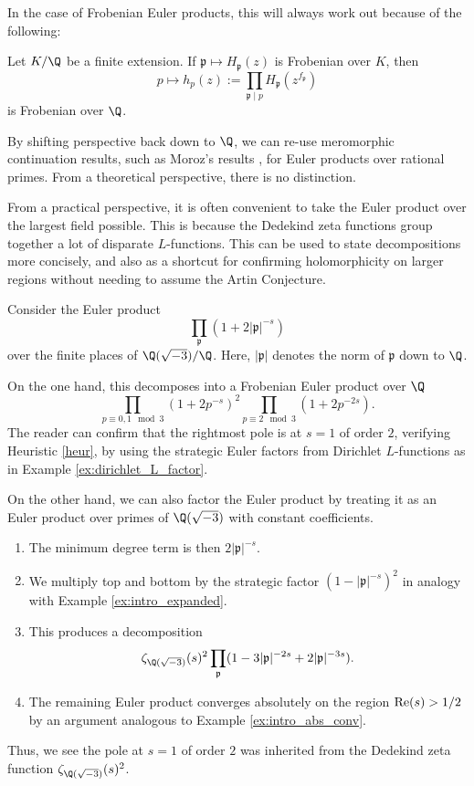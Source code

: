 \documentclass[12pt]{amsart}
\newenvironment{BOXexample}{
\begin{exbox}\mbox{}
\begin{example}
}
{
\end{example}
\end{exbox}
}
\theoremstyle{plain}
\begin{document}
In the case of Frobenian Euler products, this will always work out because of the following:
\begin{theorem}\label{thm:frob_K_to_Q}
Let $K/\Q$ be a finite extension. If $\mathfrak{p}\mapsto H_\mathfrak{p}(z)$ is Frobenian over $K$, then
\[
p\mapsto h_p(z) := \prod_{\mathfrak{p}\mid p} H_{\mathfrak{p}}(z^{f_{\mathfrak{p}}})
\]
is Frobenian over $\Q$.
\end{theorem}
By shifting perspective back down to $\Q$, we can re-use meromorphic continuation results, such as Moroz's results \cite{moroz_1988}, for Euler products over rational primes. From a theoretical perspective, there is no distinction.

From a practical perspective, it is often convenient to take the Euler product over the largest field possible. This is because the Dedekind zeta functions group together a lot of disparate $L$-functions. This can be used to state decompositions more concisely, and also as a shortcut for confirming holomorphicity on larger regions without needing to assume the Artin Conjecture.

\begin{BOXexample}
Consider the Euler product
\[
\prod_{\mathfrak{p}} (1 + 2|\mathfrak{p}|^{-s})
\]
over the finite places of $\Q(\sqrt{-3})/\Q$. Here, $|\mathfrak{p}|$ denotes the norm of $\mathfrak{p}$ down to $\Q$.

On the one hand, this decomposes into a Frobenian Euler product over $\Q$
\[
\prod_{p\equiv 0,1 \mod 3} (1 + 2p^{-s})^2\prod_{p\equiv 2\mod 3} (1 + 2p^{-2s}).
\]
The reader can confirm that the rightmost pole is at $s=1$ of order $2$, verifying Heuristic \ref{heur}, by using the strategic Euler factors from Dirichlet $L$-functions as in Example \ref{ex:dirichlet_L_factor}.

On the other hand, we can also factor the Euler product by treating it as an Euler product over primes of $\Q(\sqrt{-3})$ with constant coefficients.
\begin{enumerate}[(1)]
    \item The minimum degree term is then $2|\mathfrak{p}|^{-s}$.
    \item We multiply top and bottom by the strategic factor $(1-|\mathfrak{p}|^{-s})^2$ in analogy with Example \ref{ex:intro_expanded}.
    \item This produces a decomposition
    \[
    \zeta_{\Q(\sqrt{-3})}(s)^2 \prod_{\mathfrak{p}}(1 - 3|\mathfrak{p}|^{-2s} + 2|\mathfrak{p}|^{-3s}).
    \]
    \item The remaining Euler product converges absolutely on the region ${\rm Re}(s) > 1/2$ by an argument analogous to Example \ref{ex:intro_abs_conv}.
\end{enumerate}
Thus, we see the pole at $s=1$ of order $2$ was inherited from the Dedekind zeta function $\zeta_{\Q(\sqrt{-3})}(s)^2$.
\end{BOXexample}
\end{document}
